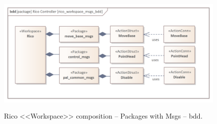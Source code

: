 \documentclass[11pt,oneside,a4paper]{article}
\begin{document}
	\begin{figure}[H]
		\centering
		\begin{center}
			{\includegraphics[scale=1.0]{img/rico_pkg/rico_workspace_msgs_bdd.png}}
		\end{center}
		\caption{Rico <<Workspace>> composition -- Packages with Msgs -- bdd.}
		\label{fig:rico_workspace_msgs_bdd}
	\end{figure}
	
			
\AtNextBibliography{\small}
\printbibliography
	
\end{document}
